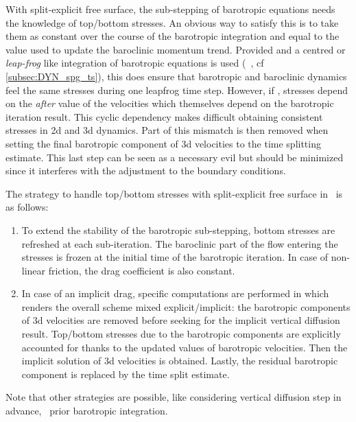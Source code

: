 \documentclass[../main/NEMO_manual]{subfiles}
\begin{document}
With split-explicit free surface, the sub-stepping of barotropic equations needs the knowledge of top/bottom stresses. An obvious way to satisfy this is to take them as constant over the course of the barotropic integration and equal to the value used to update the baroclinic momentum trend. Provided  and a centred or \textit{leap-frog} like integration of barotropic equations is used (\ie\ , cf \autoref{subsec:DYN_spg_ts}), this does ensure that barotropic and baroclinic dynamics feel the same stresses during one leapfrog time step. However, if ,  stresses depend on the \textit{after} value of the velocities which themselves depend on the barotropic iteration result. This cyclic dependency makes difficult obtaining consistent stresses in 2d and 3d dynamics. Part of this mismatch is then removed when setting the final barotropic component of 3d velocities to the time splitting estimate. This last step can be seen as a necessary evil but should be minimized since it interferes with the adjustment to the boundary conditions.

The strategy to handle top/bottom stresses with split-explicit free surface in \NEMO\ is as follows:
\begin{enumerate}
\item To extend the stability of the barotropic sub-stepping, bottom stresses are refreshed at each sub-iteration. The baroclinic part of the flow entering the stresses is frozen at the initial time of the barotropic iteration. In case of non-linear friction, the drag coefficient is also constant.
\item In case of an implicit drag, specific computations are performed in  which renders the overall scheme mixed explicit/implicit: the barotropic components of 3d velocities are removed before seeking for the implicit vertical diffusion result. Top/bottom stresses due to the barotropic components are explicitly accounted for thanks to the updated values of barotropic velocities. Then the implicit solution of 3d velocities is obtained. Lastly, the residual barotropic component is replaced by the time split estimate.
\end{enumerate}

Note that other strategies are possible, like considering vertical diffusion step in advance, \ie\ prior barotropic integration.

\end{document}
